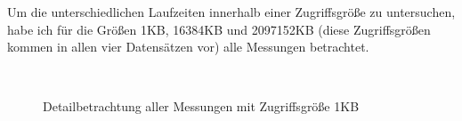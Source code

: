 \documentclass[
	12pt,
	a4paper,
	BCOR10mm,
	DIV14,
	listof=totoc,
	bibliography=totoc,
	headsepline
]{scrreprt}
\begin{document}
Um die unterschiedlichen Laufzeiten innerhalb einer Zugriffsgröße zu untersuchen, habe ich für die Größen 1KB, 16384KB und 2097152KB (diese Zugriffsgrößen kommen in allen vier Datensätzen vor) alle Messungen betrachtet.

\begin{figure}
	\hfill
	\\
	\hfill
	\caption{Detailbetrachtung aller Messungen mit Zugriffsgröße 1KB}
	\label{fig:groesse1}
\end{figure} 
\end{document}
